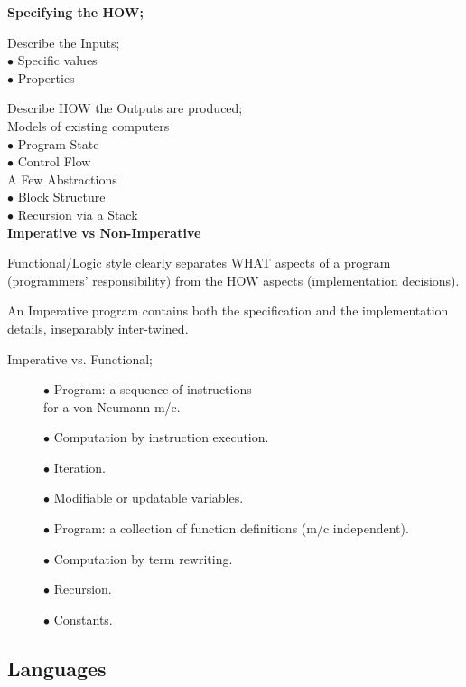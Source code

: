 \documentclass[tikz,border=10pt]{project_plan}
\newcommand{\bulletPoint}{\hspace{-3.1pt}$\bullet$ \hspace{5pt}}
\begin{document}
\textbf{Specifying the HOW;}

Describe the Inputs;\\
\bulletPoint Specific values\\
\bulletPoint Properties

Describe HOW the Outputs are produced;\\
Models of existing computers\\
\bulletPoint Program State\\
\bulletPoint Control Flow\\
A Few Abstractions\\
\bulletPoint Block Structure\\
\bulletPoint Recursion via a Stack\\

\textbf{Imperative vs Non-Imperative}

Functional/Logic style clearly separates WHAT
aspects of a program (programmers’
responsibility) from the HOW aspects
(implementation decisions).

An Imperative program contains both the
specification and the implementation details,
inseparably inter-twined.

Imperative vs. Functional;\\
\begin{figure}[H]
  \begin{minipage}{.5\textwidth}
    \bulletPoint Program: a sequence of instructions \\
    for a von Neumann m/c.

    \bulletPoint Computation by instruction execution.

    \bulletPoint Iteration.

    \bulletPoint Modifiable or updatable variables.
  \end{minipage}
  \begin{minipage}{.5\textwidth}
    \bulletPoint Program: a collection of function definitions (m/c independent).

    \bulletPoint Computation by term rewriting.

    \bulletPoint Recursion.

    \bulletPoint Constants.
  \end{minipage}
\end{figure}

\subsection{Languages}
\end{document}
